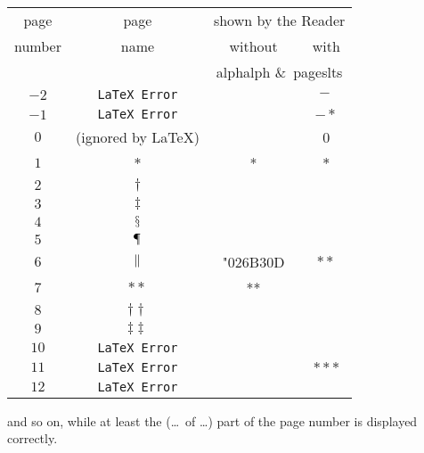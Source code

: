 \documentclass[british]{article}
\begin{document}
\begin{center}
\begin{tabular}{c|c|c|c}
page   & page & \multicolumn{2}{c|}{shown by the Reader}                \\
number & name & without       & \multicolumn{1}{c|}{with}               \\
      &   & \multicolumn{2}{c|}{\textsf{alphalph} \&\ \textsf{pageslts}}\\ \hline
$-2$ & \texttt{LaTeX Error}               &          & \ensuremath {-\ }\\
$-1$ & \texttt{LaTeX Error}               &          & \ensuremath {- *}\\
 $0$ & (ignored by \LaTeX)                &          & 0                \\
 $1$ & \ensuremath {*}                    & *        & \ensuremath {*}  \\
 $2$ & \ensuremath {\dagger }             &          &                  \\
 $3$ & \ensuremath {\ddagger }            &          &                  \\
 $4$ & \ensuremath {\mathsection }        &          &                  \\
 $5$ & \ensuremath {\mathparagraph }      &          &                  \\
 $6$ & \ensuremath {\delimiter "026B30D } & "026B30D & \ensuremath {**} \\
 $7$ & \ensuremath {**}                   & **       &                  \\
 $8$ & \ensuremath {\dagger \dagger }     &          &                  \\
 $9$ & \ensuremath {\ddagger \ddagger }   &          &                  \\
$10$ & \texttt{LaTeX Error}               &          &                  \\
$11$ & \texttt{LaTeX Error}               &          & \ensuremath {***}\\
$12$ & \texttt{LaTeX Error}               &          &                  \\
\end{tabular}
\end{center}

\noindent and so on, while at least the (\ldots\ of \ldots ) part
of the page number is displayed correctly.\\

\bigskip
\end{document}
